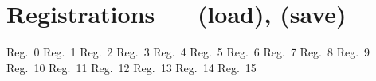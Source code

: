 \section{Registrations --- \UiKey{\REG} (load), \UiKey{\II}\UiKey{\REG} (save)}
Reg.\ 0
Reg.\ 1
Reg.\ 2
Reg.\ 3
Reg.\ 4
Reg.\ 5
Reg.\ 6
Reg.\ 7
Reg.\ 8
Reg.\ 9
Reg.\ 10
Reg.\ 11
Reg.\ 12
Reg.\ 13
Reg.\ 14
Reg.\ 15
